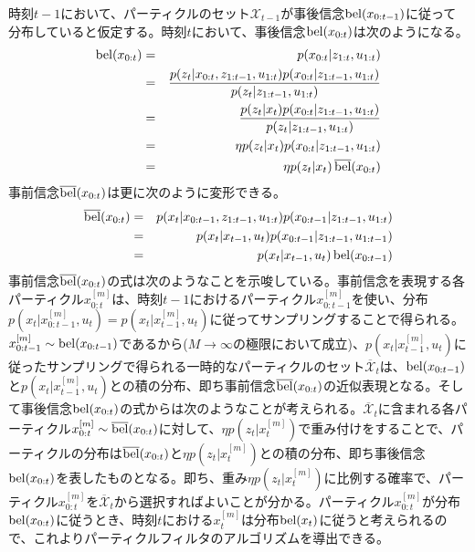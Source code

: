\documentclass[dvipdfmx,a4paper]{jsarticle}
\begin{document}
時刻$t - 1$において、パーティクルのセット$\mathcal{X}_{t - 1}$が事後信念$\operatorname{bel}(x_{0 : t - 1})$に従って分布していると仮定する。時刻$t$において、事後信念$\operatorname{bel}(x_{0 : t})$は次のようになる。
\begin{eqnarray}
	\operatorname{bel}(x_{0 : t}) &=& p(x_{0 : t} | z_{1 : t}, u_{1 : t}) \nonumber \\
	&=& \frac{p(z_t | x_{0 : t}, z_{1 : t - 1}, u_{1 : t}) p(x_{0 : t} | z_{1 : t - 1}, u_{1 : t})}{p(z_t | z_{1 : t - 1}, u_{1 : t})} \nonumber \\
	&=& \frac{p(z_t | x_t) p(x_{0 : t} | z_{1 : t - 1}, u_{1 : t})}{p(z_t | z_{1 : t - 1}, u_{1 : t})} \nonumber \\
	&=& \eta p(z_t | x_t) p(x_{0 : t} | z_{1 : t - 1}, u_{1 : t}) \nonumber \\
	&=& \eta p(z_t | x_t) \operatorname{\overline{bel}}(x_{0 : t})
\end{eqnarray}
事前信念$\operatorname{\overline{bel}}(x_{0 : t})$は更に次のように変形できる。
\begin{eqnarray}
	\operatorname{\overline{bel}}(x_{0 : t}) &=& p(x_t | x_{0 : t - 1}, z_{1 : t - 1}, u_{1 : t}) p(x_{0 : t - 1} | z_{1 : t - 1}, u_{1 : t}) \nonumber \\
	&=& p(x_t | x_{t - 1}, u_t) p(x_{0 : t - 1} | z_{1 : t - 1}, u_{1 : t - 1}) \\
	&=& p(x_t | x_{t - 1}, u_t) \operatorname{bel}(x_{0 : t - 1})
\end{eqnarray}
事前信念$\operatorname{\overline{bel}}(x_{0 : t})$の式は次のようなことを示唆している。事前信念を表現する各パーティクル$x_{0 : t}^{[m]}$は、時刻$t - 1$におけるパーティクル$x_{0 : t - 1}^{[m]}$を使い、分布$p(x_t | x_{0 : t - 1}^{[m]}, u_t) = p(x_t | x_{t - 1}^{[m]}, u_t)$に従ってサンプリングすることで得られる。$x_{0 : t - 1}^{[m]} \sim \operatorname{bel}(x_{0 : t - 1})$であるから($M \to \infty$の極限において成立)、$p(x_t | x_{t - 1}^{[m]}, u_t)$に従ったサンプリングで得られる一時的なパーティクルのセット$\overline{\mathcal{X}}_t$は、$\operatorname{bel}(x_{0 : t - 1})$と$p(x_t | x_{t - 1}^{[m]}, u_t)$との積の分布、即ち事前信念$\operatorname{\overline{bel}}(x_{0 : t})$の近似表現となる。そして事後信念$\operatorname{bel}(x_{0 : t})$の式からは次のようなことが考えられる。$\overline{\mathcal{X}}_t$に含まれる各パーティクル$x_{0 : t}^{[m]} \sim \operatorname{\overline{bel}}(x_{0 : t})$に対して、$\eta p(z_t | x_t^{[m]})$で重み付けをすることで、パーティクルの分布は$\operatorname{\overline{bel}}(x_{0 : t})$と$\eta p(z_t | x_t^{[m]})$との積の分布、即ち事後信念$\operatorname{bel}(x_{0 : t})$を表したものとなる。即ち、重み$\eta p(z_t | x_t^{[m]})$に比例する確率で、パーティクル$x_{0 : t}^{[m]}$を$\overline{\mathcal{X}}_t$から選択すればよいことが分かる。パーティクル$x_{0 : t}^{[m]}$が分布$\operatorname{bel}(x_{0 : t})$に従うとき、時刻$t$における$x_t^{[m]}$は分布$\operatorname{bel}(x_t)$に従うと考えられるので、これよりパーティクルフィルタのアルゴリズムを導出できる。
\end{document}
